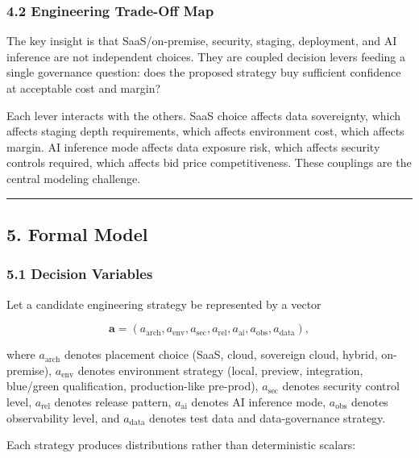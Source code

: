 \documentclass[
]{article}
\begin{document}
\subsubsection{4.2 Engineering Trade-Off
Map}\label{engineering-trade-off-map}

The key insight is that SaaS/on-premise, security, staging, deployment,
and AI inference are not independent choices. They are coupled decision
levers feeding a single governance question: does the proposed strategy
buy sufficient confidence at acceptable cost and margin?

Each lever interacts with the others. SaaS choice affects data
sovereignty, which affects staging depth requirements, which affects
environment cost, which affects margin. AI inference mode affects data
exposure risk, which affects security controls required, which affects
bid price competitiveness. These couplings are the central modeling
challenge.

\begin{center}\rule{0.5\linewidth}{0.5pt}\end{center}

\subsection{5. Formal Model}\label{formal-model}

\subsubsection{5.1 Decision Variables}\label{decision-variables}

Let a candidate engineering strategy be represented by a vector

\[\mathbf{a} = (a_{\mathrm{arch}}, a_{\mathrm{env}}, a_{\mathrm{sec}}, a_{\mathrm{rel}}, a_{\mathrm{ai}}, a_{\mathrm{obs}}, a_{\mathrm{data}}),\]

where \(a_{\mathrm{arch}}\) denotes placement choice (SaaS, cloud,
sovereign cloud, hybrid, on-premise), \(a_{\mathrm{env}}\) denotes
environment strategy (local, preview, integration, blue/green
qualification, production-like pre-prod), \(a_{\mathrm{sec}}\) denotes
security control level, \(a_{\mathrm{rel}}\) denotes release pattern,
\(a_{\mathrm{ai}}\) denotes AI inference mode, \(a_{\mathrm{obs}}\)
denotes observability level, and \(a_{\mathrm{data}}\) denotes test data
and data-governance strategy.

Each strategy produces distributions rather than deterministic scalars:
\end{document}
